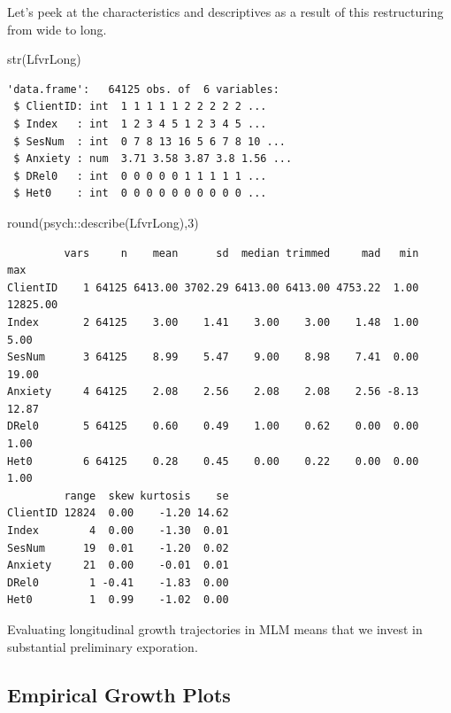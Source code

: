 \documentclass[
  11pt,
]{book}
\newenvironment{Shaded}{\begin{snugshade}}{\end{snugshade}}
\newcommand{\DecValTok}[1]{\textcolor[rgb]{0.00,0.00,0.81}{#1}}
\newcommand{\FunctionTok}[1]{\textcolor[rgb]{0.00,0.00,0.00}{#1}}
\newcommand{\NormalTok}[1]{#1}
\newcommand{\SpecialCharTok}[1]{\textcolor[rgb]{0.00,0.00,0.00}{#1}}
\begin{document}
Let's peek at the characteristics and descriptives as a result of this restructuring from wide to long.

\begin{Shaded}
\begin{Highlighting}[]
\FunctionTok{str}\NormalTok{(LfvrLong)}
\end{Highlighting}
\end{Shaded}

\begin{verbatim}
'data.frame':   64125 obs. of  6 variables:
 $ ClientID: int  1 1 1 1 1 2 2 2 2 2 ...
 $ Index   : int  1 2 3 4 5 1 2 3 4 5 ...
 $ SesNum  : int  0 7 8 13 16 5 6 7 8 10 ...
 $ Anxiety : num  3.71 3.58 3.87 3.8 1.56 ...
 $ DRel0   : int  0 0 0 0 0 1 1 1 1 1 ...
 $ Het0    : int  0 0 0 0 0 0 0 0 0 0 ...
\end{verbatim}

\begin{Shaded}
\begin{Highlighting}[]
\FunctionTok{round}\NormalTok{(psych}\SpecialCharTok{::}\FunctionTok{describe}\NormalTok{(LfvrLong),}\DecValTok{3}\NormalTok{)}
\end{Highlighting}
\end{Shaded}

\begin{verbatim}
         vars     n    mean      sd  median trimmed     mad   min      max
ClientID    1 64125 6413.00 3702.29 6413.00 6413.00 4753.22  1.00 12825.00
Index       2 64125    3.00    1.41    3.00    3.00    1.48  1.00     5.00
SesNum      3 64125    8.99    5.47    9.00    8.98    7.41  0.00    19.00
Anxiety     4 64125    2.08    2.56    2.08    2.08    2.56 -8.13    12.87
DRel0       5 64125    0.60    0.49    1.00    0.62    0.00  0.00     1.00
Het0        6 64125    0.28    0.45    0.00    0.22    0.00  0.00     1.00
         range  skew kurtosis    se
ClientID 12824  0.00    -1.20 14.62
Index        4  0.00    -1.30  0.01
SesNum      19  0.01    -1.20  0.02
Anxiety     21  0.00    -0.01  0.01
DRel0        1 -0.41    -1.83  0.00
Het0         1  0.99    -1.02  0.00
\end{verbatim}

Evaluating longitudinal growth trajectories in MLM means that we invest in substantial preliminary exporation.

\hypertarget{empirical-growth-plots}{%
\subsection{Empirical Growth Plots}\label{empirical-growth-plots}}
\end{document}
